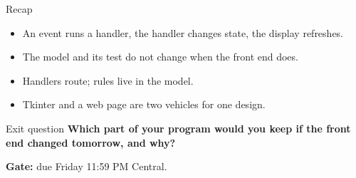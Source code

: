 \documentclass[aspectratio=169]{beamer}
\begin{document}
\begin{recapframe}{Recap}
  \begin{itemize}
    \item An event runs a handler, the handler changes state, the display refreshes.
    \item The model and its test do not change when the front end does.
    \item Handlers route; rules live in the model.
    \item Tkinter and a web page are two vehicles for one design.
  \end{itemize}
\end{recapframe}

\begin{exitframe}{Exit question}
  \Large\color{cs2primary}
  \textbf{Which part of your program would you keep if the front end changed tomorrow, and why?}

  \vspace{4mm}
  \normalsize\normalfont\color{cs2ink}
  \textbf{Gate:} due Friday 11:59 PM Central.
\end{exitframe}
\end{document}
